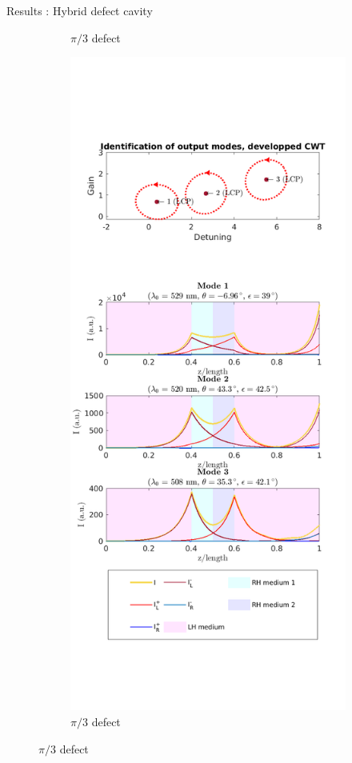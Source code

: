 \documentclass[aspectratio=169]{beamer}
\begin{document}
\begin{frame}{Results : Hybrid defect cavity}
\begin{figure}
\begin{subfigure}{0.24\linewidth}
			\caption{$\pi/3$ defect}
		\end{subfigure}
		\begin{subfigure}{0.24\linewidth}
			\centering
			\includegraphics[height=0.8\textheight]{plots/hybrid_defect/pi_3/intensity_distribution}
			\caption{$\pi/3$ defect}
		\end{subfigure}
	\end{figure}
\end{frame}
\end{document}
